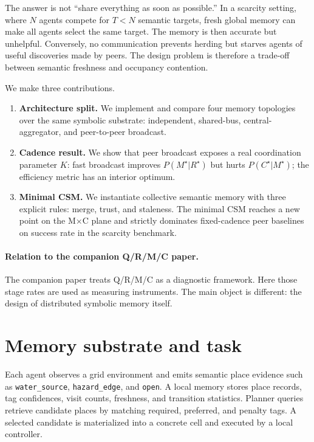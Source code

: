 \documentclass{article}
\begin{document}
The answer is not ``share everything as soon as possible.'' In a
scarcity setting, where $N$ agents compete for $T<N$ semantic targets,
fresh global memory can make all agents select the same target. The
memory is then accurate but unhelpful. Conversely, no communication
prevents herding but starves agents of useful discoveries made by
peers. The design problem is therefore a trade-off between semantic
freshness and occupancy contention.

We make three contributions.
\begin{enumerate}[leftmargin=20pt,itemsep=2pt,topsep=2pt]
\item \textbf{Architecture split.} We implement and compare four memory topologies over the same symbolic substrate: independent, shared-bus, central-aggregator, and peer-to-peer broadcast.
\item \textbf{Cadence result.} We show that peer broadcast exposes a real coordination parameter $K$: fast broadcast improves $P(M^\star|R^\star)$ but hurts $P(C^\star|M^\star)$; the efficiency metric has an interior optimum.
\item \textbf{Minimal CSM.} We instantiate collective semantic memory with three explicit rules: merge, trust, and staleness. The minimal CSM reaches a new point on the M$\times$C plane and strictly dominates fixed-cadence peer baselines on success rate in the scarcity benchmark.
\end{enumerate}

\paragraph{Relation to the companion Q/R/M/C paper.}
The companion paper treats Q/R/M/C as a diagnostic framework. Here
those stage rates are used as measuring instruments. The main object
is different: the design of distributed symbolic memory itself.

\section{Memory substrate and task}
\label{sec:substrate}

Each agent observes a grid environment and emits semantic place
evidence such as \texttt{water\_source}, \texttt{hazard\_edge}, and
\texttt{open}. A local memory stores place records, tag confidences,
visit counts, freshness, and transition statistics. Planner queries
retrieve candidate places by matching required, preferred, and penalty
tags. A selected candidate is materialized into a concrete cell and
executed by a local controller.
\end{document}
